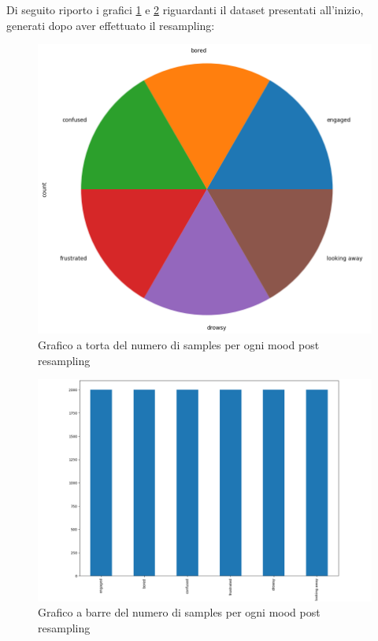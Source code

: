 Di seguito riporto i grafici \ref{fig:image11} e \ref{fig:image12} riguardanti il dataset presentati all’inizio, generati dopo aver effettuato il resampling:
\begin{figure}
    \begin{center}    
        \includegraphics[width=1\linewidth]{images/image45.png}
        \caption{Grafico a torta del numero di samples per ogni mood post resampling}
        \label{fig:image11}
    \end{center}
\end{figure}
\begin{figure}
    \begin{center}    
        \includegraphics[width=1\linewidth]{images/image46.png}
        \caption{Grafico a barre del numero di samples per ogni mood post resampling}
        \label{fig:image12}
    \end{center}
\end{figure}